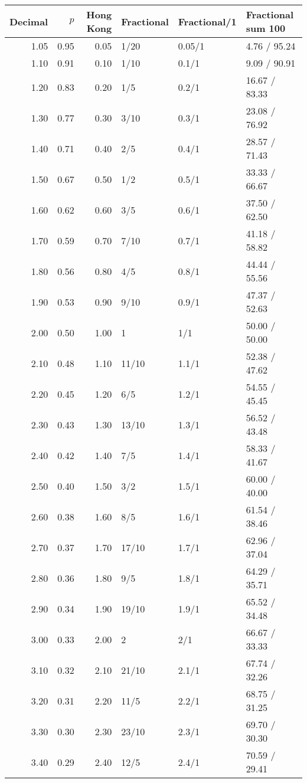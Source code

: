 \begin{longtable}{rrrlll}
  \hline
Decimal & $p$ & Hong Kong & Fractional & Fractional/1 & Fractional sum 100 \\ 
  \hline
1.05 & 0.95 & 0.05 & 1/20 & 0.05/1 &  4.76 / 95.24 \\ 
  1.10 & 0.91 & 0.10 & 1/10 & 0.1/1 &  9.09 / 90.91 \\ 
  1.20 & 0.83 & 0.20 & 1/5 & 0.2/1 & 16.67 / 83.33 \\ 
  1.30 & 0.77 & 0.30 & 3/10 & 0.3/1 & 23.08 / 76.92 \\ 
  1.40 & 0.71 & 0.40 & 2/5 & 0.4/1 & 28.57 / 71.43 \\ 
  1.50 & 0.67 & 0.50 & 1/2 & 0.5/1 & 33.33 / 66.67 \\ 
  1.60 & 0.62 & 0.60 & 3/5 & 0.6/1 & 37.50 / 62.50 \\ 
  1.70 & 0.59 & 0.70 & 7/10 & 0.7/1 & 41.18 / 58.82 \\ 
  1.80 & 0.56 & 0.80 & 4/5 & 0.8/1 & 44.44 / 55.56 \\ 
  1.90 & 0.53 & 0.90 & 9/10 & 0.9/1 & 47.37 / 52.63 \\ 
  2.00 & 0.50 & 1.00 & 1 & 1/1 & 50.00 / 50.00 \\ 
  2.10 & 0.48 & 1.10 & 11/10 & 1.1/1 & 52.38 / 47.62 \\ 
  2.20 & 0.45 & 1.20 & 6/5 & 1.2/1 & 54.55 / 45.45 \\ 
  2.30 & 0.43 & 1.30 & 13/10 & 1.3/1 & 56.52 / 43.48 \\ 
  2.40 & 0.42 & 1.40 & 7/5 & 1.4/1 & 58.33 / 41.67 \\ 
  2.50 & 0.40 & 1.50 & 3/2 & 1.5/1 & 60.00 / 40.00 \\ 
  2.60 & 0.38 & 1.60 & 8/5 & 1.6/1 & 61.54 / 38.46 \\ 
  2.70 & 0.37 & 1.70 & 17/10 & 1.7/1 & 62.96 / 37.04 \\ 
  2.80 & 0.36 & 1.80 & 9/5 & 1.8/1 & 64.29 / 35.71 \\ 
  2.90 & 0.34 & 1.90 & 19/10 & 1.9/1 & 65.52 / 34.48 \\ 
  3.00 & 0.33 & 2.00 & 2 & 2/1 & 66.67 / 33.33 \\ 
  3.10 & 0.32 & 2.10 & 21/10 & 2.1/1 & 67.74 / 32.26 \\ 
  3.20 & 0.31 & 2.20 & 11/5 & 2.2/1 & 68.75 / 31.25 \\ 
  3.30 & 0.30 & 2.30 & 23/10 & 2.3/1 & 69.70 / 30.30 \\ 
  3.40 & 0.29 & 2.40 & 12/5 & 2.4/1 & 70.59 / 29.41 \\ 

\end{longtable}
